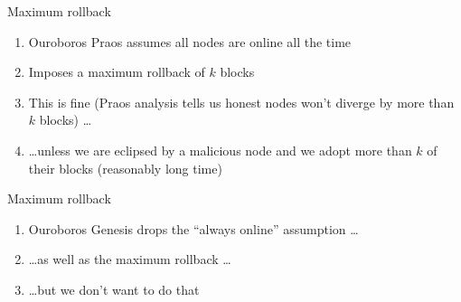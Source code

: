 \documentclass[usenames,dvipsnames,t]{beamer}
\begin{document}
\begin{frame}{Maximum rollback}

\begin{enumerate}

\item Ouroboros Praos assumes all nodes are online all the time

\item Imposes a maximum rollback of $k$ blocks

\item This is fine (Praos analysis tells us honest nodes won't diverge by more than $k$ blocks) \dots

\pause

\item \dots unless we are eclipsed by a malicious node and we adopt more than
$k$ of their blocks (reasonably long time)

\end{enumerate}

\end{frame}


\begin{frame}{Maximum rollback}

\begin{enumerate}

\item Ouroboros Genesis drops the ``always online'' assumption \dots \pause

\item \dots as well as the maximum rollback \dots \pause

\item \dots but we don't want to do that

\end{enumerate}

\end{frame}

\end{document}
